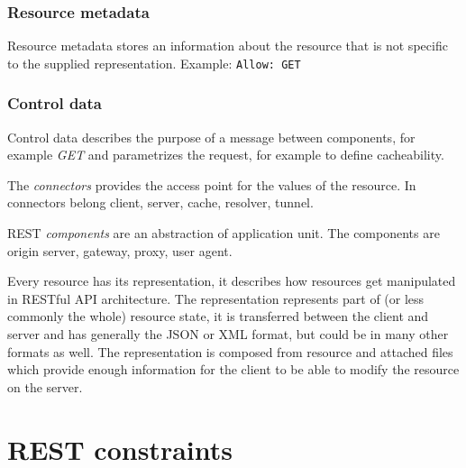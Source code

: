 \subsubsection{Resource metadata}
  Resource metadata stores an information about the resource that is not specific to the supplied representation.
  Example: \texttt{Allow: GET}
  
\subsubsection{Control data}
  Control data describes the purpose of a message between components, for example \emph{GET} and parametrizes the request, for example to define cacheability. 

The \emph{connectors} provides the access point for the values of the resource. In connectors belong client, server, cache, resolver, tunnel. %

REST \emph{components} are an abstraction of application unit. The components are origin server, gateway, proxy, user agent. %

\bigskip

Every resource has its representation, it describes how resources get manipulated in RESTful API architecture. The representation represents part of (or less commonly the whole) resource state, it is transferred between the client and server and has generally the JSON or XML format, but could be in many other formats as well. The representation is composed from resource and attached files which provide enough information for the client to be able to modify the resource on the server.

\section{REST constraints}
\label{sec:constraints}

